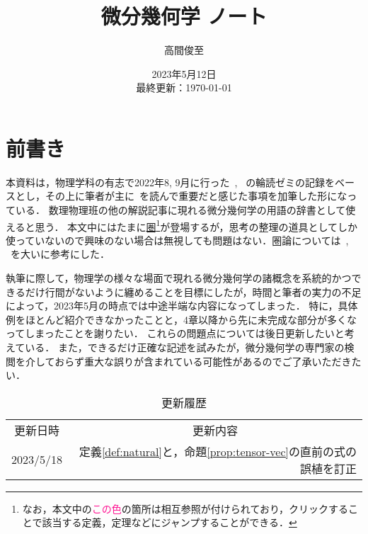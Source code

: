 \documentclass{ltjsreport}
\theoremstyle{mystyle} %
\numberwithin{equation}{section}
\begin{document}
\title{微分幾何学 ノート}
\author{高間俊至}
\date{2023年5月12日 \\ 最終更新：\today}
\maketitle

\section*{前書き}

本資料は，物理学科の有志で2022年8, 9月に行った~\cite{Morita}, ~\cite{EGH}の輪読ゼミの記録をベースとし，その上に筆者が主に~\cite{Lee12}を読んで重要だと感じた事項を加筆した形になっている．
数理物理班の他の解説記事に現れる微分幾何学の用語の辞書として使えると思う．
本文中にはたまに\hyperref[def:category]{圏}\footnote{なお，本文中の\textcolor{DeepPink}{この色}の箇所は相互参照が付けられており，クリックすることで該当する定義，定理などにジャンプすることができる．}が登場するが，思考の整理の道具としてしか使っていないので興味のない場合は無視しても問題はない．圏論については~\cite{Awodey}, ~\cite{Brendan}を大いに参考にした．

執筆に際して，物理学の様々な場面で現れる微分幾何学の諸概念を系統的かつできるだけ行間がないように纏めることを目標にしたが，時間と筆者の実力の不足によって，2023年5月の時点では中途半端な内容になってしまった．
特に，具体例をほとんど紹介できなかったことと，4章以降から先に未完成な部分が多くなってしまったことを謝りたい．
これらの問題点については後日更新したいと考えている．
また，できるだけ正確な記述を試みたが，微分幾何学の専門家の検閲を介しておらず重大な誤りが含まれている可能性があるのでご了承いただきたい．

\begin{table}[H]
    \centering
    \caption[]{更新履歴}
    \label{tab:update}
    \begin{tabular}{l|r}
        \multicolumn{1}{c}{更新日時} &
        \multicolumn{1}{|c}{更新内容} \\
        \hhline{-|-}
        2023/5/18 & 定義\ref{def:natural}と，命題\ref{prop:tensor-vec}の直前の式の誤植を訂正 \\
    \end{tabular}
\end{table}%
\setcounter{tocdepth}{2}
\tableofcontents








\end{document}
